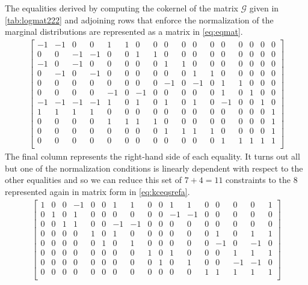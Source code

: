 The equalities derived by computing the cokernel of the matrix $\mathcal{G}$ given in \ref{tab:logmat222} and adjoining rows that enforce the normalization of the marginal distributions are represented as a matrix in \ref{eq:eqmat}.
\begin{equation}\label{eq:eqmat}
\begin{aligned}
\begin{bmatrix}
  -1 & -1 & 0 & 0 & 1 & 1 & 0 & 0 & 0 & 0 & 0 & 0 & 0 & 0 & 0 & 0 & 0\\
  0 & 0 & -1 & -1 & 0 & 0 & 1 & 1 & 0 & 0 & 0 & 0 & 0 & 0 & 0 & 0 & 0\\
  -1 & 0 & -1 & 0 & 0 & 0 & 0 & 0 & 1 & 1 & 0 & 0 & 0 & 0 & 0 & 0 & 0\\
  0 & -1 & 0 & -1 & 0 & 0 & 0 & 0 & 0 & 0 & 1 & 1 & 0 & 0 & 0 & 0 & 0\\
  0 & 0 & 0 & 0 & 0 & 0 & 0 & 0 & -1 & 0 & -1 & 0 & 1 & 1 & 0 & 0 & 0\\
  0 & 0 & 0 & 0 & -1 & 0 & -1 & 0 & 0 & 0 & 0 & 0 & 1 & 0 & 1 & 0 & 0\\
  -1 & -1 & -1 & -1 & 1 & 0 & 1 & 0 & 1 & 0 & 1 & 0 & -1 & 0 & 0 & 1 & 0\\
  1 & 1 & 1 & 1 & 0 & 0 & 0 & 0 & 0 & 0 & 0 & 0 & 0 & 0 & 0 & 0 & 1\\
  0 & 0 & 0 & 0 & 1 & 1 & 1 & 1 & 0 & 0 & 0 & 0 & 0 & 0 & 0 & 0 & 1\\
  0 & 0 & 0 & 0 & 0 & 0 & 0 & 0 & 1 & 1 & 1 & 1 & 0 & 0 & 0 & 0 & 1\\
  0 & 0 & 0 & 0 & 0 & 0 & 0 & 0 & 0 & 0 & 0 & 0 & 1 & 1 & 1 & 1 & 1\\
\end{bmatrix}
\end{aligned}
\end{equation}
The final column represents the right-hand side of each equality. It turns out all but one of the normalization conditions is linearly dependent with respect to the other equalities and so we can reduce this set of $7+4=11$ constraints to the $8$ represented again in matrix form in \ref{eq:kceqsrefa}.
\begin{equation}\label{eq:kceqsrefa}
\begin{aligned}
\begin{bmatrix}
  1 & 0 & 0 & -1 & 0 & 0 & 1 & 1 & 0 & 0 & 1 & 1 & 0 & 0 & 0 & 0 & 1\\
  0 & 1 & 0 & 1 & 0 & 0 & 0 & 0 & 0 & 0 & -1 & -1 & 0 & 0 & 0 & 0 & 0\\
  0 & 0 & 1 & 1 & 0 & 0 & -1 & -1 & 0 & 0 & 0 & 0 & 0 & 0 & 0 & 0 & 0\\
  0 & 0 & 0 & 0 & 1 & 0 & 1 & 0 & 0 & 0 & 0 & 0 & 0 & 1 & 0 & 1 & 1\\
  0 & 0 & 0 & 0 & 0 & 1 & 0 & 1 & 0 & 0 & 0 & 0 & 0 & -1 & 0 & -1 & 0\\
  0 & 0 & 0 & 0 & 0 & 0 & 0 & 0 & 1 & 0 & 1 & 0 & 0 & 0 & 1 & 1 & 1\\
  0 & 0 & 0 & 0 & 0 & 0 & 0 & 0 & 0 & 1 & 0 & 1 & 0 & 0 & -1 & -1 & 0\\
  0 & 0 & 0 & 0 & 0 & 0 & 0 & 0 & 0 & 0 & 0 & 0 & 1 & 1 & 1 & 1 & 1\\
\end{bmatrix}
\end{aligned}
\end{equation}
